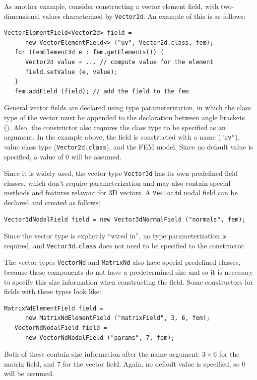 As another example, consider constructing a vector element field, with
two-dimensional values characterized by {\tt Vector2d}. An example
of this is as follows:
%
\begin{lstlisting}[]
   VectorElementField<Vector2d> field = 
      new VectorElementField<> ("uv", Vector2d.class, fem);
   for (FemElement3d e : fem.getElements()) {
      Vector2d value = ... // compute value for the element
      field.setValue (e, value);
   }
   fem.addField (field); // add the field to the fem
\end{lstlisting}
%
General vector fields are declared using type parameterization, in
which the class type of the vector must be appended to the declaration
between angle brackets ({\tt < >}). Also, the constructor also
requires the class type to be specified as an argument. In the example
above, the field is constructed with a name ({\tt "uv"}), value class
type ({\tt Vector2d.class}), and the FEM model. Since no default value is
specified, a value of 0 will be assumed.

Since it is widely used, the vector type {\tt Vector3d} has its own
predefined field classes, which don't require parameterization and may
also contain special methods and features relavant for 3D vectors.  A
{\tt Vector3d} nodal field can be declared and created as follows:
%
\begin{lstlisting}[]
    Vector3dNodalField field = new Vector3dNormalField ("normals", fem);  
\end{lstlisting}
%
Since the vector type is explicitly ``wired in'', no type
parameterization is required, and {\tt Vector3d.class} does not need
to be specified to the constructor.

The vector types {\tt VectorNd} and {\tt MatrixNd} also have special
predefined classes, because these components do not have a
predetermined size and so it is necessary to specify this size
information when constructing the field. Some constructors for fields
with these types look like:
%
\begin{lstlisting}[]
   MatrixNdElementField field = 
      new MatrixNdElementField ("matrixField", 3, 6, fem);
   VectorNdNodalField field = 
      new VectorNdNodalField ("params", 7, fem);
\end{lstlisting}
%
Both of these contain size information after the name
argument: $3 \times 6$ for the matrix field, and 7 for the vector
field. Again, no default value is specified, so 0 will be assumed.

